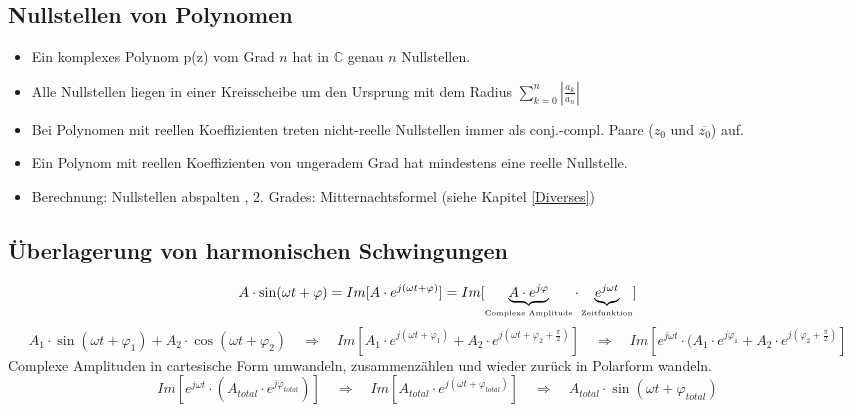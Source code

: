 \subsection{Nullstellen von Polynomen}
\begin{itemize}
  \item Ein komplexes Polynom p(z) vom Grad $n$ hat in $ \mathbb{C}$ genau $n$
  Nullstellen.
  \item Alle Nullstellen liegen in einer Kreisscheibe um den Ursprung mit dem
  Radius $ \sum\limits_{k=0}^{n} \left| \frac{a_k}{a_n} \right|$
  \item Bei Polynomen mit reellen Koeffizienten treten nicht-reelle Nullstellen
  immer als conj.-compl. Paare ($z_0$ und $\overline{z_0}$) auf.
  \item Ein Polynom mit reellen Koeffizienten von ungeradem Grad hat mindestens
  eine reelle Nullstelle.
  \item Berechnung: Nullstellen abspalten , 2. Grades: Mitternachtsformel (siehe
  Kapitel \ref{Diverses}) 
\end{itemize}

\subsection{Überlagerung von harmonischen Schwingungen}
$$A \cdot \sin(\omega t + \varphi) = Im[A \cdot e^{j(\omega t + \varphi)}] =
Im[\underbrace{A \cdot e^{j\varphi}}_{\text{\tiny{Complexe Amplitude}}}
\cdot \underbrace{e^{j\omega t}}_{\text{\tiny{Zeitfunktion}}}]$$
%
%
$$ A_1 \cdot \sin(\omega t + \varphi_1) + A_2 \cdot \cos(\omega t + \varphi_2) 
 \quad \Rightarrow \quad 
 Im[A_1 \cdot e^{j(\omega t + \varphi_1)} + A_2 \cdot e^{j (\omega t + \varphi_2
 + \frac{\pi}{2})}] \quad \Rightarrow \quad 
 Im[e^{j \omega t} \cdot  (A_1 \cdot e^{j \varphi_1} + A_2 \cdot e^{j (\varphi_2
 + \frac{\pi}{2})}]$$ 
Complexe Amplituden in cartesische Form umwandeln, zusammenzählen und wieder
zurück in Polarform wandeln.
$$ Im[e^{j \omega t} \cdot  (A_{total} \cdot e^{j \varphi_{total}})] 
 \quad \Rightarrow \quad 
 Im[A_{total} \cdot e^{j (\omega t + \varphi_{total})}] 
 \quad \Rightarrow \quad 
 A_{total} \cdot \sin(\omega t + \varphi_{total})$$

